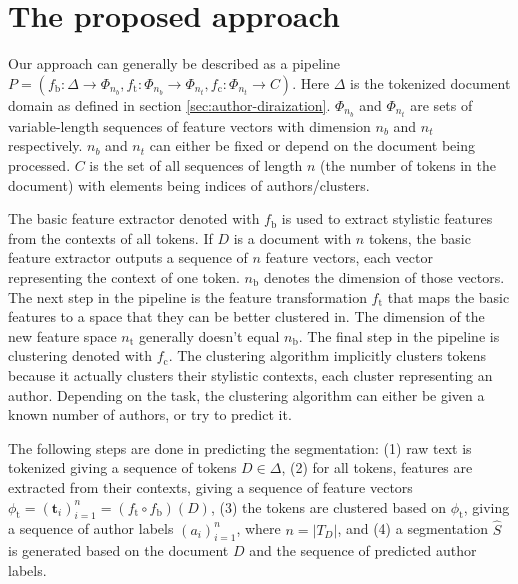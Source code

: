 \documentclass[10pt, a4paper]{article}
\newcommand{\vect}[1]{\bm{#1}}
\begin{document}
\section{The proposed approach}

Our approach can generally be described as a pipeline $P = (f_\mathrm{b}:\Delta\rightarrow \Phi_{n_b}, f_\mathrm{t}:\Phi_{n_b}\rightarrow \Phi_{n_t}, f_\mathrm{c}:\Phi_{n_t}\rightarrow C)$. Here $\Delta$ is the tokenized document domain as defined in section \ref{sec:author-diraization}. $\Phi_{n_b}$ and $\Phi_{n_t}$ are sets of variable-length sequences of feature vectors with dimension $n_b$ and $n_t$ respectively. $n_b$ and $n_t$ can either be fixed or depend on the document being processed. $C$ is the set of all sequences of length $n$ (the number of tokens in the document) with elements being indices of authors/clusters.

The basic feature extractor denoted with $f_\mathrm{b}$ is used to extract stylistic features from the contexts of all tokens. If $D$ is a document with $n$ tokens, the basic feature extractor outputs a sequence of $n$ feature vectors, each vector representing the context of one token. $n_\mathrm{b}$ denotes the dimension of those vectors. The next step in the pipeline is the feature transformation $f_\mathrm{t}$ that maps the basic features to a space that they can be better clustered in. The dimension of the new feature space $n_\mathrm{t}$ generally doesn't equal $n_\mathrm{b}$. The final step in the pipeline is clustering denoted with $f_\mathrm{c}$. The clustering algorithm implicitly clusters tokens because it actually clusters their stylistic contexts, each cluster representing an author. Depending on the task, the clustering algorithm can either be given a known number of authors, or try to predict it.

The following steps are done in predicting the segmentation: (1) raw text is tokenized giving a sequence of tokens $D\in\Delta$, (2) for all tokens, features are extracted from their contexts, giving a sequence of feature vectors $\phi_\mathrm{t} = (\vect{t}_i)_{i=1}^n = (f_\mathrm{t}\circ f_\mathrm{b})(D)$, (3) the tokens are clustered based on $\phi_\mathrm{t}$, giving a sequence of author labels $(a_i)_{i=1}^{n}$, where $n=|T_D|$, and (4) a segmentation $\hat{S}$ is generated based on the document $D$ and the sequence of predicted author labels.
\end{document}

